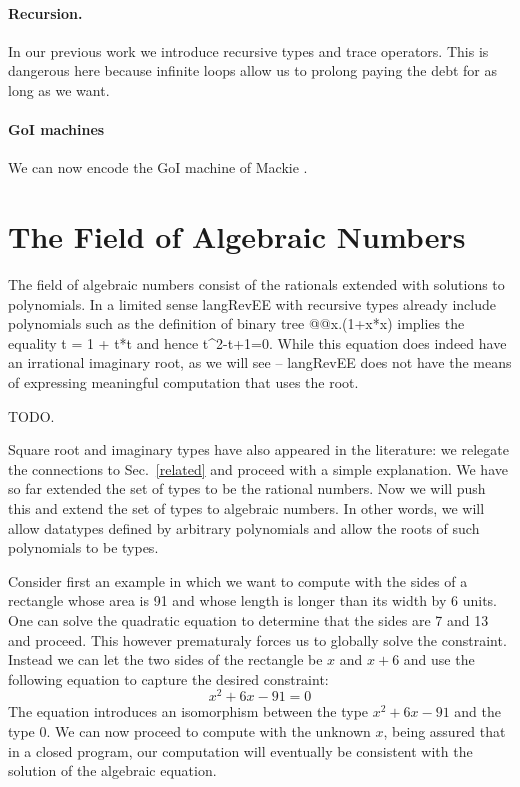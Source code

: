 \documentclass[preprint]{sigplanconf}
\begin{document}
\paragraph*{Recursion.} In our previous work we introduce recursive types and
trace operators. This is dangerous here because infinite loops allow us to
prolong paying the debt for as long as we want.

\paragraph*{GoI machines} 
We can now encode the GoI machine of Mackie \cite{Mackie2011,DBLP:conf/popl/Mackie95}.

\section{The Field of Algebraic Numbers} 

The field of algebraic numbers consist of the rationals extended with
solutions to polynomials. In a limited sense {{langRevEE}} with
recursive types already include polynomials such as the definition of
binary tree {{@@x.(1+x*x)}} implies the equality {{t = 1 + t*t}} and
hence {{t^2-t+1=0}}. While this equation does indeed have an
irrational imaginary root, as we will see -- {{langRevEE}} does not
have the means of expressing meaningful computation that uses the
root.

TODO.

Square root and imaginary types have also appeared in the literature: we
relegate the connections to Sec.~\ref{related} and proceed with a simple
explanation. We have so far extended the set of types to be the rational
numbers. Now we will push this and extend the set of types to algebraic
numbers. In other words, we will allow datatypes defined by arbitrary
polynomials and allow the roots of such polynomials to be types. 

Consider first an example in which we want to compute with the sides of a
rectangle whose area is 91 and whose length is longer than its width by 6
units. One can solve the quadratic equation to determine that the sides are 7
and 13 and proceed. This however prematuraly forces us to globally solve the
constraint. Instead we can let the two sides of the rectangle be $x$ and
$x+6$ and use the following equation to capture the desired constraint:
\[
x^2 + 6x - 91 = 0
\]
The equation introduces an isomorphism between the type $x^2 + 6x - 91$ and
the type $0$. We can now proceed to compute with the unknown $x$, being
assured that in a closed program, our computation will eventually be
consistent with the solution of the algebraic equation. 
\end{document}
